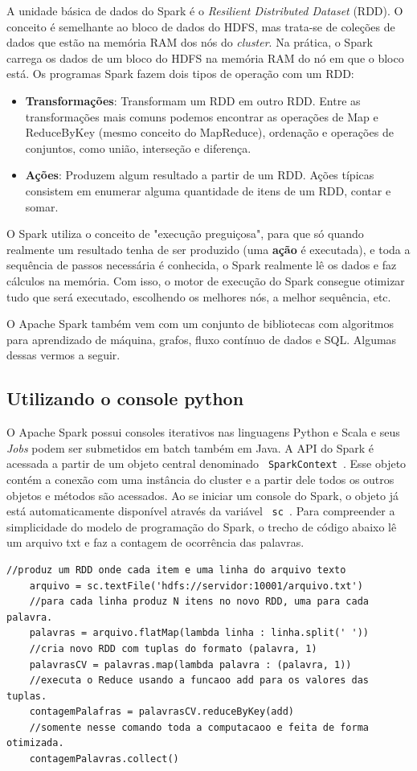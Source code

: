 A unidade básica de dados do Spark é o \textit{Resilient Distributed Dataset} (RDD). O conceito é semelhante ao bloco de dados do HDFS, mas trata-se de coleções de dados que estão na memória RAM dos nós do \textit{cluster}. Na prática, o Spark carrega os dados de um bloco do HDFS na memória RAM do nó em que o bloco está. Os programas Spark fazem dois tipos de operação com um RDD:
\begin{itemize}
	\item \textbf{Transformações}: Transformam um RDD em outro RDD. Entre as transformações mais comuns podemos encontrar as operações de Map e ReduceByKey (mesmo conceito do MapReduce), ordenação e operações de conjuntos, como união, interseção e diferença.
	\item \textbf{Ações}: Produzem algum resultado a partir de um RDD. Ações típicas consistem em enumerar alguma quantidade de itens de um RDD, contar e somar. 
\end{itemize}

O Spark utiliza o conceito de "execução preguiçosa", para que só quando realmente um resultado tenha de ser produzido (uma \textbf{ação} é executada), e toda a sequência de passos necessária é conhecida, o Spark realmente lê os dados e faz cálculos na memória. Com isso, o motor de execução do Spark consegue otimizar tudo que será executado, escolhendo os melhores nós, a melhor sequência, etc.

O Apache Spark também vem com um conjunto de bibliotecas com algoritmos para aprendizado de máquina, grafos, fluxo contínuo de dados e SQL. Algumas dessas vermos a seguir.

\subsection{Utilizando o console python}
O Apache Spark possui consoles iterativos nas linguagens Python e Scala e seus \textit{Jobs} podem ser submetidos em batch também em Java. A API do Spark é acessada a partir de um objeto central denominado \texttt{ SparkContext }. Esse objeto contém a conexão com uma instância do cluster e a partir dele todos os outros objetos e métodos são acessados. Ao se iniciar um console do Spark, o objeto já está automaticamente disponível através da variável \texttt{ sc }. Para compreender a simplicidade do modelo de programação do Spark, o trecho de código abaixo lê um arquivo txt e faz a contagem de ocorrência das palavras.

\begin{lstlisting}[style=MyPythonStyle]
    //produz um RDD onde cada item e uma linha do arquivo texto
    arquivo = sc.textFile('hdfs://servidor:10001/arquivo.txt') 
    //para cada linha produz N itens no novo RDD, uma para cada palavra.
    palavras = arquivo.flatMap(lambda linha : linha.split(' ')) 
    //cria novo RDD com tuplas do formato (palavra, 1)
    palavrasCV = palavras.map(lambda palavra : (palavra, 1)) 
    //executa o Reduce usando a funcaoo add para os valores das tuplas.
    contagemPalafras = palavrasCV.reduceByKey(add) 
    //somente nesse comando toda a computacaoo e feita de forma otimizada.
    contagemPalavras.collect() 
\end{lstlisting}

